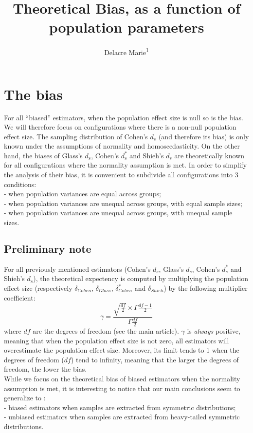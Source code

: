 \documentclass[
  english,
  man]{apa6}
\title{Theoretical Bias, as a function of population parameters}
\author{Delacre Marie\textsuperscript{1}}
\date{}
\affiliation{\vspace{0.5cm}\textsuperscript{1} ULB}
\begin{document}
\maketitle

\hypertarget{the-bias}{%
\section{The bias}\label{the-bias}}

For all \enquote{biased} estimators, when the population effect size is null so is the bias. We will therefore focus on configurations where there is a non-null population effect size. The sampling distribution of Cohen's \(d_s\) (and therefore its bias) is only known under the assumptions of normality and homoscedasticity. On the other hand, the biases of Glass's \(d_s\), Cohen's \(d^*_s\) and Shieh's \(d_s\) are theoretically known for all configurations where the normality assumption is met. In order to simplify the analysis of their bias, it is convenient to subdivide all configurations into 3 conditions:\\
- when population variances are equal across groups;\\
- when population variances are unequal across groups, with equal sample sizes;\\
- when population variances are unequal across groups, with unequal sample sizes.

\hypertarget{preliminary-note}{%
\subsection{Preliminary note}\label{preliminary-note}}

For all previously mentioned estimators (Cohen's \(d_s\), Glass's \(d_s\), Cohen's \(d^*_s\) and Shieh's \(d_s\)), the theoretical expectency is computed by multiplying the population effect size (respectively \(\delta_{Cohen}\), \(\delta_{Glass}\), \(\delta^*_{Cohen}\) and \(\delta_{Shieh}\)) by the following multiplier coefficient:
\begin{equation} 
\gamma=\frac{\sqrt{\frac{df}{2}} \times \Gamma{\frac{df-1}{2}}}{\Gamma{\frac{df}{2}}}
\label{eq:mc}
\end{equation}
where \(df\) are the degrees of freedom (see the main article). \(\gamma\) is \emph{always} positive, meaning that when the population effect size is not zero, all estimators will overestimate the population effect size. Moreover, its limit tends to 1 when the degrees of freedom (\(df\)) tend to infinity, meaning that the larger the degrees of freedom, the lower the bias.\\
While we focus on the theoretical bias of biased estimators when the normality assumption is met, it is interesting to notice that our main conclusions seem to generalize to :\\
- biased estimators when samples are extracted from symmetric distributions;\\
- unbiased estimators when samples are extracted from heavy-tailed symmetric distributions.
\end{document}
